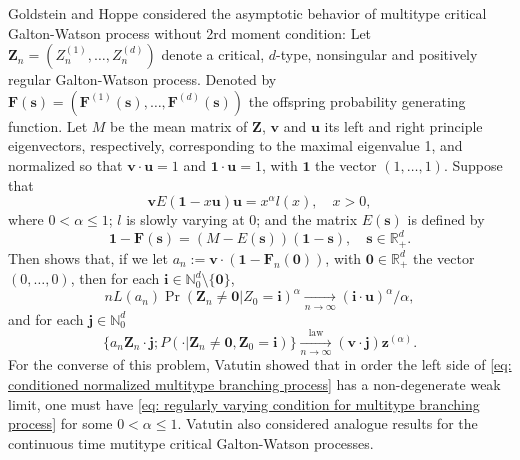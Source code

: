 \documentclass[12pt, a4paper]{amsart}
\theoremstyle{definition}
\numberwithin{equation}{section}
\begin{document}
	Goldstein and Hoppe \cite{GoldsteinHoppe1978Critical} considered the asymptotic behavior of multitype critical Galton-Watson process without 2rd moment condition:
	Let $\mathbf Z_n=(Z_n^{(1)}, \dots, Z_n^{(d)})$ denote a critical, $d$-type, nonsingular and positively regular Galton-Watson process.
	Denoted by $\mathbf F(\mathbf s) = (\mathbf F^{(1)}(\mathbf s), \dots, \mathbf F^{(d)}(\mathbf s))$ the offspring probability generating function. 
	Let $M$ be the mean matrix of $\mathbf Z$, $\mathbf v$ and $\mathbf u$ its left and right principle eigenvectors, respectively, corresponding to the maximal eigenvalue 1, and normalized so that $\mathbf v \cdot \mathbf u = 1$ and $\mathbf 1 \cdot \mathbf u = 1$, with $\mathbf 1$ the vector $(1,\dots, 1)$.
	Suppose that
\[\label{eq: regularly varying condition for multitype branching process}
	\mathbf v E(\mathbf 1-x\mathbf u) \mathbf u 
	= x^\alpha l(x),
	\quad x > 0,
\]
	where $0 < \alpha \leq 1$; $l$ is slowly varying at $0$; and  the matrix $E(\mathbf s)$ is defined by
\[
	\mathbf 1 - \mathbf F(\mathbf s) 
	= (M - E(\mathbf s))(\mathbf 1 - \mathbf s), 
	\quad \mathbf s \in \mathbb R_+^d.
\]
	Then \cite{GoldsteinHoppe1978Critical} shows that, if we let $a_n := \mathbf v \cdot (\mathbf 1 - \mathbf F_n(\mathbf 0))$, with $\mathbf 0 \in \mathbb R_+^d$ the vector $(0,\dots, 0)$, then for each $\mathbf i \in \mathbb N_0^d \setminus \{\mathbf 0\}$,
\[ \label{eq: limit behavior of the exitinction probability without finite variance of multitype branching processes}
	n L(a_n) \operatorname{Pr}(\mathbf Z_n \neq \mathbf 0| Z_0 = \mathbf i)^\alpha 
	\xrightarrow[n\to \infty]{} (\mathbf i \cdot \mathbf u)^\alpha / \alpha, 
\]
	and for each $\mathbf j \in \mathbb N_0^d$
\[\label{eq: conditioned normalized multitype branching process}
	\{ a_n \mathbf Z_n \cdot \mathbf j ; P(\cdot | \mathbf Z_n \neq \mathbf 0, \mathbf Z_0 = \mathbf i)\}
	\xrightarrow[n\to \infty]{\operatorname{law}} (\mathbf v\cdot \mathbf j) \mathbf z^{(\alpha)}.
\]
	For the converse of this problem, Vatutin \cite{Vatutin1977Limit} showed that in order the left side of \eqref{eq: conditioned normalized multitype branching process} has a non-degenerate weak limit, one must have \eqref{eq: regularly varying condition for multitype branching process} for some $0 < \alpha \leq 1$.  
	Vatutin \cite{Vatutin1977Limit} also considered analogue results for the continuous time mutitype critical Galton-Watson processes.
	
\end{document}
